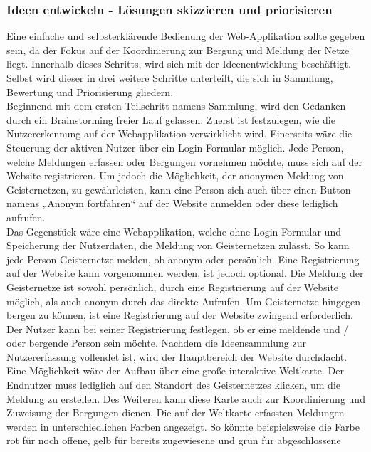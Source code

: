 \documentclass[11pt]{article}
\begin{document}
    \subsubsection{Ideen entwickeln - Lösungen skizzieren und priorisieren}
    Eine einfache und selbsterklärende Bedienung der Web-Applikation sollte gegeben sein, da der Fokus auf der Koordinierung zur Bergung und Meldung der Netze liegt.
    Innerhalb dieses Schritts, wird sich mit der Ideenentwicklung beschäftigt. Selbst wird dieser in drei weitere Schritte unterteilt, 
    die sich in Sammlung, Bewertung und Priorisierung gliedern.
    \\[1\baselineskip]
    Beginnend mit dem ersten Teilschritt namens Sammlung, wird den Gedanken durch ein Brainstorming freier Lauf gelassen.
    Zuerst ist festzulegen, wie die Nutzererkennung auf der Webapplikation verwirklicht wird.
    Einerseits wäre die Steuerung der aktiven Nutzer über ein Login-Formular möglich. Jede Person, welche Meldungen erfassen oder Bergungen vornehmen möchte, 
    muss sich auf der Website registrieren. Um jedoch die Möglichkeit, der anonymen Meldung von Geisternetzen, zu gewährleisten, kann eine Person sich auch über einen Button namens
    „Anonym fortfahren“ auf der Website anmelden oder diese lediglich aufrufen.
    \\
    Das Gegenstück wäre eine Webapplikation, welche ohne Login-Formular und Speicherung der Nutzerdaten, die Meldung von Geisternetzen zulässt.
    So kann jede Person Geisternetze melden, ob anonym oder persönlich. Eine Registrierung auf der Website kann vorgenommen werden, ist jedoch optional. Die Meldung der Geisternetze ist sowohl persönlich, durch eine Registrierung auf der Website möglich,
    als auch anonym durch das direkte Aufrufen. Um Geisternetze hingegen bergen zu können, ist eine
    Registrierung auf der Website zwingend erforderlich. Der Nutzer kann bei seiner Registrierung festlegen, ob er eine meldende und / oder bergende
    Person sein möchte.
    Nachdem die Ideensammlung zur Nutzererfassung vollendet ist, wird der Hauptbereich der Website durchdacht.
    Eine Möglichkeit wäre der Aufbau über eine große interaktive Weltkarte. Der Endnutzer muss lediglich auf den Standort des Geisternetzes klicken, um die Meldung zu erstellen.
    Des Weiteren kann diese Karte auch zur Koordinierung und Zuweisung der Bergungen dienen. 
    Die auf der Weltkarte erfassten Meldungen werden in unterschiedlichen Farben angezeigt. So könnte beispielsweise die Farbe rot für noch offene, gelb für bereits zugewiesene und grün für abgeschlossene
\end{document}
